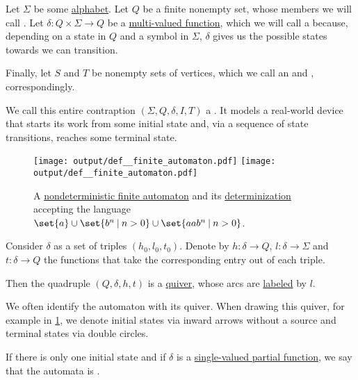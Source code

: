 \begin{definition}\label{def:finite_automaton}
  Let \( \Sigma \) be some \hyperref[def:formal_language]{alphabet}. Let \( Q \) be a finite nonempty set, whose members we will call . Let \( \delta: Q \times \Sigma \to Q \) be a \hyperref[def:multi_valued_function/total]{multi-valued function}, which we will call a  because, depending on a state in \( Q \) and a symbol in \( \Sigma \), \( \delta \) gives us the possible states towards we can transition.

  Finally, let \( S \) and \( T \) be nonempty sets of vertices, which we call an  and , correspondingly.

  We call this entire contraption \( (\Sigma, Q, \delta, I, T) \) a . It models a real-world device that starts its work from some initial state and, via a sequence of state transitions, reaches some terminal state.

  \begin{figure}[!ht]
    \hfill
    \texttt{[image: output/def\_\_finite\_automaton.pdf]}
    \hfill
    \texttt{[image: output/def\_\_finite\_automaton.pdf]}
    \hfill\hfill
    \caption{A \hyperref[def:finite_automaton/determinism]{nondeterministic finite automaton} and its \hyperref[alg:determinization_of_finite_automata]{determinization} accepting the language \( \set{ a } \cup \set{ b^n \given n > 0 } \cup \set{ aa b^n \given n > 0 } \).}
    \label{fig:def:finite_automaton}
  \end{figure}

  \begin{thmenum}
     Consider \( \delta \) as a set of triples \( (h_0, l_0, t_0) \). Denote by \( h: \delta \to Q \), \( l: \delta \to \Sigma \) and \( t: \delta \to Q \) the functions that take the corresponding entry out of each triple.

    Then the quadruple \( (Q, \delta, h, t) \) is a \hyperref[def:quiver]{quiver}, whose arcs are \hyperref[def:labeled_set]{labeled} by \( l \).

    We often identify the automaton with its quiver. When drawing this quiver, for example in \cref{fig:def:finite_automaton}, we denote initial states via inward arrows without a source and terminal states via double circles.

     If there is only one initial state and if \( \delta \) is a \hyperref[def:partial_function]{single-valued partial function}, we say that the automata is .


\end{thmenum}
\end{definition}

